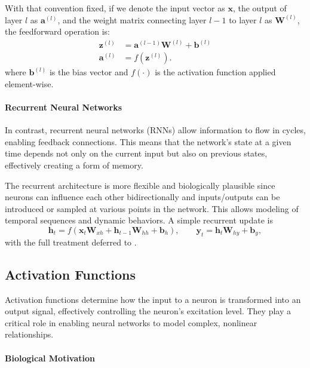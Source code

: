 With that convention fixed, if we denote the input vector as \(\mathbf{x}\), the output of layer \(l\) as \(\mathbf{a}^{(l)}\), and the weight matrix connecting layer \(l-1\) to layer \(l\) as \(\mathbf{W}^{(l)}\), the feedforward operation is:
\begin{equation}
\begin{aligned}
    \mathbf{z}^{(l)} &= \mathbf{a}^{(l-1)} \mathbf{W}^{(l)} + \mathbf{b}^{(l)} \\
    \mathbf{a}^{(l)} &= f(\mathbf{z}^{(l)}).
\end{aligned}
\label{eq:feedforward}
\end{equation}
where \(\mathbf{b}^{(l)}\) is the bias vector and \(f(\cdot)\) is the activation function applied element-wise.

\paragraph{Recurrent Neural Networks}

In contrast, recurrent neural networks (RNNs) allow information to flow in cycles, enabling feedback connections. This means that the network's state at a given time depends not only on the current input but also on previous states, effectively creating a form of memory.

The recurrent architecture is more flexible and biologically plausible since neurons can influence each other bidirectionally and inputs/outputs can be introduced or sampled at various points in the network. This allows modeling of temporal sequences and dynamic behaviors. A simple recurrent update is
\[
\mathbf{h}_t = f(\mathbf{x}_t \mathbf{W}_{xh} + \mathbf{h}_{t-1} \mathbf{W}_{hh} + \mathbf{b}_h), \qquad
\mathbf{y}_t = \mathbf{h}_t \mathbf{W}_{hy} + \mathbf{b}_y,
\]
with the full treatment deferred to .

\subsection{Activation Functions}
\label{sec:perceptron_activation_functions}

Activation functions determine how the input to a neuron is transformed into an output signal, effectively controlling the neuron's excitation level. They play a critical role in enabling neural networks to model complex, nonlinear relationships.

\paragraph{Biological Motivation}

